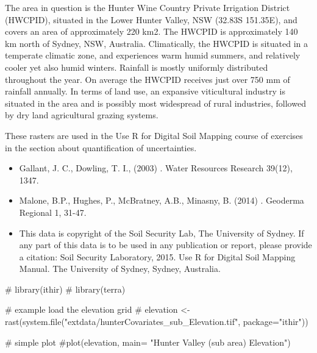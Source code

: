 \documentclass[a4paper]{book}
\begin{document}
%
\begin{Details}
The area in question is the Hunter Wine Country Private Irrigation District (HWCPID), situated in the Lower Hunter Valley, NSW (32.83S 151.35E), and covers an area of approximately 220 km2. The HWCPID is approximately 140 km north of Sydney, NSW, Australia. Climatically, the HWCPID is situated in a temperate climatic zone, and experiences warm humid summers, and relatively cooler yet also humid winters. Rainfall is mostly uniformly distributed throughout the year. On average the HWCPID receives just over 750 mm of rainfall annually. In terms of land use, an expansive viticultural industry is situated in the area and is possibly most widespread
of rural industries, followed by dry land agricultural grazing systems.
\end{Details}
%
\begin{Note}
These rasters are used in the Use R for Digital Soil Mapping course of exercises in the section about quantification of uncertainties.
\end{Note}
%
\begin{References}
\begin{itemize}

\item{} Gallant, J. C., Dowling, T. I., (2003) . Water Resources Research 39(12), 1347. 
\item{} Malone, B.P., Hughes, P.,  McBratney, A.B., Minasny, B. (2014) . Geoderma Regional 1, 31-47.
\item{} This data is copyright of the Soil Security Lab, The University of Sydney. If any part of this data is to be used in any publication or report, please provide a citation:
Soil Security Laboratory, 2015. Use R for Digital Soil Mapping Manual. The University of Sydney, Sydney, Australia.

\end{itemize}

\end{References}
%
\begin{Examples}
\begin{ExampleCode}

# library(ithir)
# library(terra)

# example load the elevation grid
# elevation <- rast(system.file("extdata/hunterCovariates_sub_Elevation.tif", package="ithir"))

# simple plot
#plot(elevation, main= "Hunter Valley (sub area) Elevation")
\end{ExampleCode}
\end{Examples}
\end{document}
